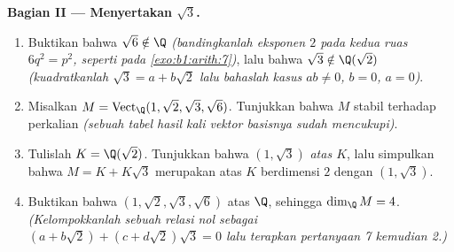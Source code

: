 \begin{problem}
\medskip
\noindent\textbf{Bagian II --- Menyertakan $\sqrt3$.}
\begin{enumerate}[resume]
  \item Buktikan bahwa $\sqrt6 \notin \Q$ \emph{(bandingkanlah eksponen
        $2$ pada kedua ruas $6q^2 = p^2$, seperti pada
        \cref{exo:b1:arith:7})}, lalu bahwa $\sqrt3 \notin
        \Q(\sqrt2)$ \emph{(kuadratkanlah $\sqrt3 = a + b\sqrt2$ lalu
        bahaslah kasus $ab \neq 0$, $b = 0$, $a = 0$)}.
  \item Misalkan $M = \operatorname{Vect}_\Q(1, \sqrt2, \sqrt3,
        \sqrt6)$. Tunjukkan bahwa $M$ stabil terhadap perkalian
        \emph{(sebuah tabel hasil kali vektor basisnya sudah
        mencukupi)}.
  \item Tulislah $K = \Q(\sqrt2)$. Tunjukkan bahwa $(1, \sqrt3)$ 
        \emph{atas  $K$}, lalu simpulkan bahwa $M = K +
        K\sqrt3$ merupakan  atas $K$ berdimensi $2$ dengan
         $(1, \sqrt3)$.
  \item Buktikan bahwa $(1, \sqrt2, \sqrt3, \sqrt6)$  atas
        $\Q$, sehingga $\dim_\Q M = 4$. \emph{(Kelompokkanlah sebuah relasi nol
        sebagai $(a + b\sqrt2) + (c + d\sqrt2)\sqrt3 = 0$ lalu terapkan
        pertanyaan 7 kemudian 2.)}
\end{enumerate}


\end{problem}
